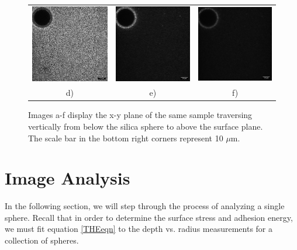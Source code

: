 \begin{figure}[h!]
\begin{tabular}{ccc}
		\includegraphics[width= .33\linewidth]{Chapters/Figures/190215_g91_glass_sphere011_cascade4.png} & \includegraphics[width= .33\linewidth]{Chapters/Figures/190215_g91_glass_sphere011_cascade5.png} & \includegraphics[width= .33\linewidth]{Chapters/Figures/190215_g91_glass_sphere011_cascade6.png}
		\\
		d) & e) & f) \label{fig:sphere011cascade}
	\end{tabular}
	\caption[Vertical path through image stack]{Images a-f display the x-y plane of the same sample traversing vertically from below the silica sphere to above the surface plane. The scale bar in the bottom right corners represent 10 $\mu$m.}
\end{figure}


\section{Image Analysis}
In the following section, we will step through the process of analyzing a single sphere. Recall that in order to determine the surface stress and adhesion energy, we must fit equation \ref{THEeqn} to the depth vs. radius measurements for a collection of spheres.  

